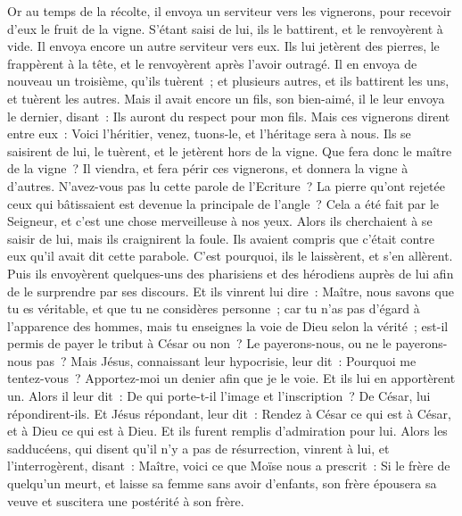 \begin{multicols}{2}
Or au temps de la récolte, il envoya un serviteur vers les vignerons, pour recevoir d'eux le fruit de la vigne.
S'étant saisi de lui, ils le battirent, et le renvoyèrent à vide.
Il envoya encore un autre serviteur vers eux. Ils lui jetèrent des pierres, le frappèrent à la tête, et le renvoyèrent après l'avoir outragé.
Il en envoya de nouveau un troisième, qu'ils tuèrent~; et plusieurs autres, et ils battirent les uns, et tuèrent les autres.
Mais il avait encore un fils, son bien-aimé, il le leur envoya le dernier, disant~: Ils auront du respect pour mon fils.
Mais ces vignerons dirent entre eux~: Voici l'héritier, venez, tuons-le, et l'héritage sera à nous.
Ils se saisirent de lui, le tuèrent, et le jetèrent hors de la vigne.
Que fera donc le maître de la vigne~? Il viendra, et fera périr ces vignerons, et donnera la vigne à d'autres.
N'avez-vous pas lu cette parole de l'Ecriture~? La pierre qu'ont rejetée ceux qui bâtissaient est devenue la principale de l'angle~?
Cela a été fait par le Seigneur, et c'est une chose merveilleuse à nos yeux.
Alors ils cherchaient à se saisir de lui, mais ils craignirent la foule. Ils avaient compris que c'était contre eux qu'il avait dit cette parabole. C'est pourquoi, ils le laissèrent, et s'en allèrent.
Puis ils envoyèrent quelques-uns des pharisiens et des hérodiens auprès de lui afin de le surprendre par ses discours.
Et ils vinrent lui dire~: Maître, nous savons que tu es véritable, et que tu ne considères personne~; car tu n'as pas d'égard à l'apparence des hommes, mais tu enseignes la voie de Dieu selon la vérité~; est-il permis de payer le tribut à César ou non~? Le payerons-nous, ou ne le payerons-nous pas~?
Mais Jésus, connaissant leur hypocrisie, leur dit~: Pourquoi me tentez-vous~? Apportez-moi un denier afin que je le voie.
Et ils lui en apportèrent un. Alors il leur dit~: De qui porte-t-il l'image et l'inscription~? De César, lui répondirent-ils.
Et Jésus répondant, leur dit~: Rendez à César ce qui est à César, et à Dieu ce qui est à Dieu. Et ils furent remplis d'admiration pour lui.
Alors les sadducéens, qui disent qu'il n'y a pas de résurrection, vinrent à lui, et l'interrogèrent, disant~:
Maître, voici ce que Moïse nous a prescrit~: Si le frère de quelqu'un meurt, et laisse sa femme sans avoir d'enfants, son frère épousera sa veuve et suscitera une postérité à son frère.

\end{multicols}
